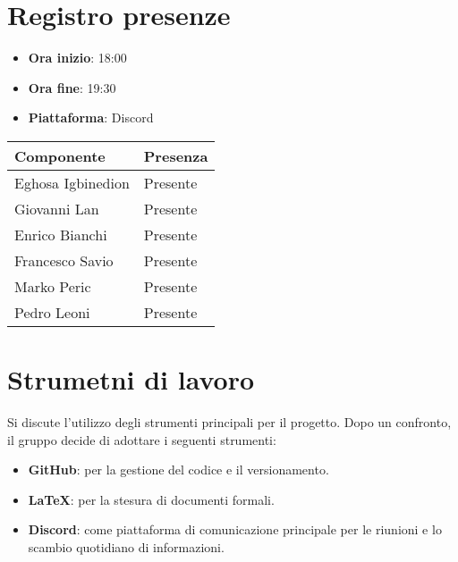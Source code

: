 \documentclass[a4paper, 12pt]{article}
\begin{document}
\section{Registro presenze}
   \begin{itemize}
        \item[] \textbf{Ora inizio}:  18:00
        \item[] \textbf{Ora fine}: 19:30
        \item[] \textbf{Piattaforma}: Discord	
    \end{itemize}
\begin{table}[!h]
    \centering
    {\renewcommand{\arraystretch}{2}
    \begin{tabularx}{\textwidth}{| X | X |}
        \hline
            \textbf{\large Componente} & 
            \textbf{\large Presenza} \\ 
        \hline 
        \hline
            Eghosa Igbinedion&
            Presente \\
        \hline 
        \hline
            Giovanni Lan&
            Presente \\
        \hline 
        \hline
            Enrico Bianchi&
            Presente \\
        \hline 
        \hline
            Francesco Savio&
            Presente \\
        \hline 
        \hline
            Marko Peric&
            Presente \\
        \hline 
        \hline
            Pedro Leoni&
            Presente \\
        \hline 

    \end{tabularx}}
\end{table}

\newpage

\section{Strumetni di lavoro}
Si discute l’utilizzo degli strumenti principali per il progetto. Dopo un confronto, il gruppo decide di adottare i seguenti strumenti:
\begin{itemize}
    \item \textbf{GitHub}: per la gestione del codice e il versionamento.
    \item \textbf{LaTeX}: per la stesura di documenti formali.
    \item \textbf{Discord}: come piattaforma di comunicazione principale per le riunioni e lo scambio quotidiano di informazioni.
\end{itemize}
\end{document}
